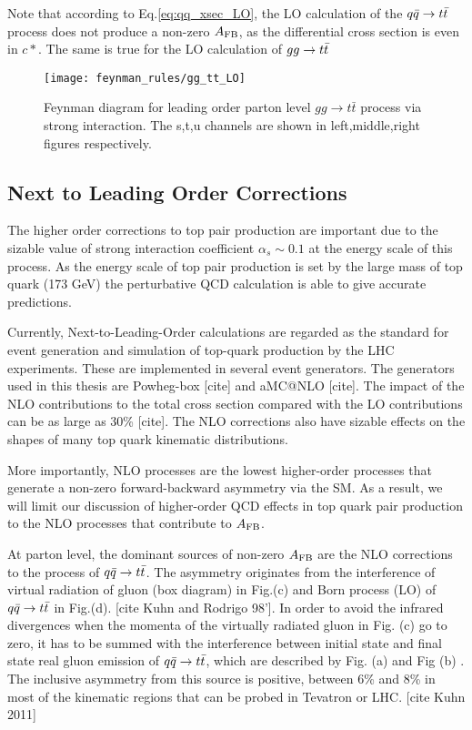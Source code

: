 Note that according to Eq.\ref{eq:qq_xsec_LO}, the LO calculation of the $q\bar q \rightarrow t \bar t$ process does not produce a non-zero $A_{\mathrm{FB}}$, as the differential cross section is even in $c*$. The same is true for the LO calculation of $gg \rightarrow t \bar t$

\begin{figure}[hbt]
  \begin{center}
    \texttt{[image: feynman\_rules/gg\_tt\_LO]}
  \caption{\small Feynman diagram for leading order parton level $gg \rightarrow t\bar t$ process via strong interaction. The s,t,u channels are shown in left,middle,right figures respectively.  }
    \label{fig:gg_tt_LO}
  \end{center}
\end{figure}

\clearpage

\subsection{Next to Leading Order Corrections}
\label{sec:LO production}
The higher order corrections to top pair production are important due to the sizable value of strong interaction coefficient $\alpha_s\sim 0.1$ at the energy scale of this process. As the energy scale of top pair production is set by the large mass of top quark (173 GeV) the perturbative QCD calculation is able to give accurate predictions. 

Currently, Next-to-Leading-Order calculations are regarded as the standard for event generation and simulation of top-quark production by the LHC experiments. These are implemented in several event generators.  The generators used in this thesis are Powheg-box [cite] and aMC@NLO [cite]. The impact of the NLO contributions to the total cross section compared with the LO contributions can be as large as 30\% [cite]. The NLO corrections also have sizable effects on the shapes of many top quark kinematic distributions. 

More importantly, NLO processes are the lowest higher-order processes that generate a non-zero forward-backward asymmetry via the SM. As a result, we will limit our discussion of higher-order QCD effects in top quark pair production to the NLO processes that contribute to $A_{\mathrm{FB}}$.

At parton level, the dominant sources of non-zero $A_{\mathrm{FB}}$ are the NLO corrections to the process of $q\bar q \rightarrow t \bar t$. The asymmetry originates from the interference of virtual radiation of gluon (box diagram) in Fig.(c) and Born process (LO) of $q\bar q \rightarrow t \bar t$ in Fig.(d). [cite Kuhn and Rodrigo 98']. In order to avoid the infrared divergences when the momenta of the virtually radiated gluon in Fig. (c) go to zero, it has to be summed with the interference between initial state and final state real gluon emission of $q\bar q \rightarrow t \bar t$, which are described by Fig. (a) and Fig (b) . The inclusive asymmetry from this source is positive, between 6\% and 8\% in most of the kinematic regions that can be probed in Tevatron or LHC. [cite Kuhn 2011] 

